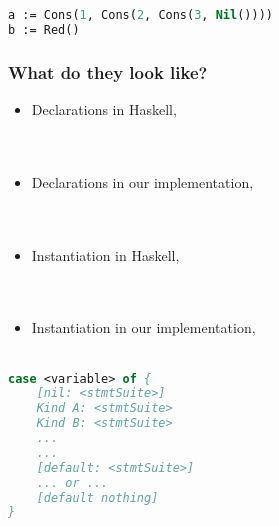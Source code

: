 \documentclass{beamer}
\begin{document}
\begin{lrbox}{\pZeroTypesInst}
\begin{lstlisting}[language=Pascal, basicstyle=\footnotesize]
a := Cons(1, Cons(2, Cons(3, Nil())))
b := Red()
\end{lstlisting}
\end{lrbox}

\begin{frame}
\frametitle{What do they look like?}
\begin{itemize}
 \item<1-> Declarations in Haskell,\\
    \usebox{\haskellTypes} \\
    \ \\
 \item<2-> Declarations in our implementation,\\
    \usebox{\pZeroTypes} \\
    \ \\
 \item<3-> Instantiation in Haskell,\\
    \usebox{\haskellTypesInst} \\
    \ \\
 \item<4-> Instantiation in our implementation,\\
    \usebox{\pZeroTypesInst} \\
\end{itemize}

\end{frame}

\begin{lrbox}{\anatomyOfCaseBox}
\begin{lstlisting}[language=Pascal, basicstyle=\footnotesize]
case <variable> of {
    [nil: <stmtSuite>]
    Kind A: <stmtSuite>
    Kind B: <stmtSuite>
    ...
    ...
    [default: <stmtSuite>]
    ... or ...
    [default nothing]
}
\end{lstlisting}
\end{lrbox}
\end{document}
